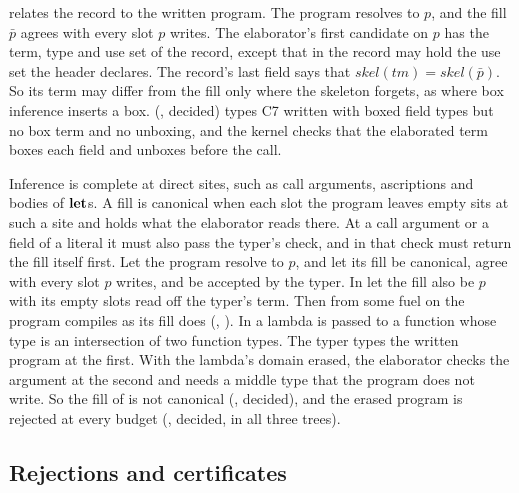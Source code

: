  relates the record to the written program. The program resolves to $p$, and the fill $\bar{p}$ agrees with every slot $p$ writes. The elaborator's first candidate on $p$ has the term, type and use set of the record, except that in \treeCL the record may hold the use set the header declares. The record's last field says that $\mathit{skel}(\mathit{tm}) = \mathit{skel}(\bar{p})$. So its term may differ from the fill only where the skeleton forgets, as where box inference inserts a box.  (\treeK, decided) types C7 written with boxed field types but no box term and no unboxing, and the kernel checks that the elaborated term boxes each field and unboxes before the call.

Inference is complete at direct sites, such as call arguments, ascriptions and bodies of $\mathbf{let}$s. A fill is canonical when each slot the program leaves empty sits at such a site and holds what the elaborator reads there. At a call argument or a field of a literal it must also pass the typer's check, and in \treeK that check must return the fill itself first. Let the program resolve to $p$, and let its fill be canonical, agree with every slot $p$ writes, and be accepted by the typer. In \treeK let the fill also be $p$ with its empty slots read off the typer's term. Then from some fuel on the program compiles as its fill does (, ). In  a lambda is passed to a function whose type is an intersection of two function types. The typer types the written program at the first. With the lambda's domain erased, the elaborator checks the argument at the second and needs a middle type that the program does not write. So the fill of  is not canonical (, decided), and the erased program is rejected at every budget (, decided, in all three trees).

\subsection{Rejections and certificates}\label{sec:fe-reject}

